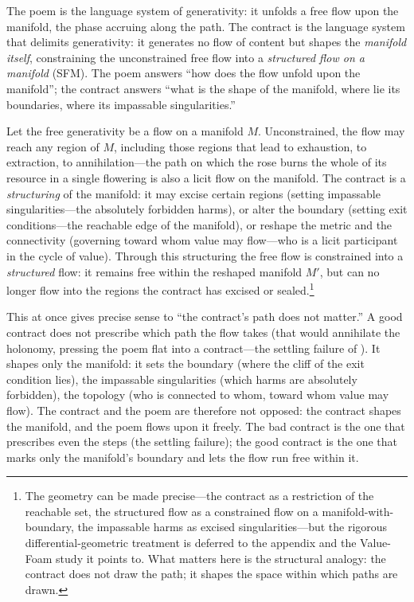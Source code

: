 \begin{claim}
The poem is the language system of generativity: it unfolds a free flow upon the manifold, the phase accruing along the path. The contract is the language system that delimits generativity: it generates no flow of content but shapes the \emph{manifold itself}, constraining the unconstrained free flow into a \emph{structured flow on a manifold} (SFM). The poem answers ``how does the flow unfold upon the manifold''; the contract answers ``what is the shape of the manifold, where lie its boundaries, where its impassable singularities.''
\end{claim}

Let the free generativity be a flow on a manifold $M$. Unconstrained, the flow may reach any region of $M$, including those regions that lead to exhaustion, to extraction, to annihilation---the path on which the rose burns the whole of its resource in a single flowering is also a licit flow on the manifold. The contract is a \emph{structuring} of the manifold: it may excise certain regions (setting impassable singularities---the absolutely forbidden harms), or alter the boundary (setting exit conditions---the reachable edge of the manifold), or reshape the metric and the connectivity (governing toward whom value may flow---who is a licit participant in the cycle of value). Through this structuring the free flow is constrained into a \emph{structured} flow: it remains free within the reshaped manifold $M'$, but can no longer flow into the regions the contract has excised or sealed.\footnote{The geometry can be made precise---the contract as a restriction of the reachable set, the structured flow as a constrained flow on a manifold-with-boundary, the impassable harms as excised singularities---but the rigorous differential-geometric treatment is deferred to the appendix and the Value-Foam study it points to. What matters here is the structural analogy: the contract does not draw the path; it shapes the space within which paths are drawn.}

This at once gives precise sense to ``the contract's path does not matter.'' A good contract does not prescribe which path the flow takes (that would annihilate the holonomy, pressing the poem flat into a contract---the settling failure of ). It shapes only the manifold: it sets the boundary (where the cliff of the exit condition lies), the impassable singularities (which harms are absolutely forbidden), the topology (who is connected to whom, toward whom value may flow).  The contract and the poem are therefore not opposed: the contract shapes the manifold, and the poem flows upon it freely. The bad contract is the one that prescribes even the steps (the settling failure); the good contract is the one that marks only the manifold's boundary and lets the flow run free within it.

